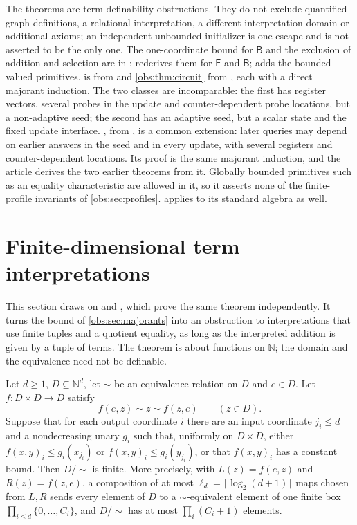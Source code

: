 \begin{remark}
The theorems are term-definability obstructions. They do not exclude
quantified graph definitions, a relational interpretation, a different
interpretation domain or additional axioms; an independent unbounded
initializer is one escape and is not asserted to be the only one. The
one-coordinate bound for $\mathsf{B}$ and the exclusion of addition and
selection are in ;  rederives them for
$\mathsf{F}$ and $\mathsf{B}$;  adds the bounded-valued
primitives.  is from  and
\cref{obs:thm:circuit} from , each with a direct majorant
induction. The two classes are incomparable: the first has register vectors,
several probes in the update and counter-dependent probe locations, but a
non-adaptive seed; the second has an adaptive seed, but a scalar state and the
fixed update interface. , from ,
is a common extension: later queries may depend on earlier answers in the seed
and in every update, with several registers and counter-dependent locations.
Its proof is the same majorant induction, and the article derives the two
earlier theorems from it. Globally bounded primitives such as an equality
characteristic are allowed in it, so it asserts none of the finite-profile
invariants of \cref{obs:sec:profiles}.  applies to
its standard algebra as well.
\end{remark}

\section{Finite-dimensional term interpretations}
\label{obs:sec:quotient}

This section draws on  and , which prove
the same theorem independently. It turns the bound of
\cref{obs:sec:majorants} into an obstruction to interpretations that use finite
tuples and a quotient equality, as long as the interpreted addition is given by
a tuple of terms. The theorem is about functions on $\mathbb{N}$; the domain
and the equivalence need not be definable.

\begin{theorem}
\label{obs:thm:quotient}
Let $d\ge 1$, $D\subseteq\mathbb{N}^d$, let $\sim$ be an equivalence relation
on $D$ and $e\in D$. Let $f\colon D\times D\to D$ satisfy
\[
f(e,z)\sim z\sim f(z,e)\qquad(z\in D).
\]
Suppose that for each output coordinate $i$ there are an input coordinate
$j_i\le d$ and a nondecreasing unary $g_i$ such that, uniformly on
$D\times D$, either $f(x,y)_i\le g_i(x_{j_i})$ or
$f(x,y)_i\le g_i(y_{j_i})$, or that $f(x,y)_i$ has a constant bound. Then
$D/{\sim}$ is finite. More precisely, with $L(z)=f(e,z)$ and $R(z)=f(z,e)$, a
composition of at most $\ell_d=\lceil\log_2(d+1)\rceil$ maps chosen from
$L,R$ sends every element of $D$ to a $\sim$-equivalent element of one finite
box $\prod_{i\le d}\{0,\dots,C_i\}$, and $D/{\sim}$ has at most
$\prod_i(C_i+1)$ elements.
\end{theorem}

